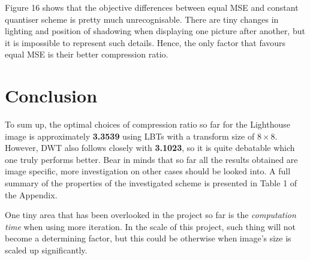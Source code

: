 \documentclass[a4paper, 11pt]{article}
\begin{document}
Figure 16 shows that the objective differences between equal MSE and constant quantiser scheme is pretty much unrecognisable. There are tiny changes in lighting and position of shadowing when displaying one picture after another, but it is impossible to represent such details. Hence, the only factor that favours equal MSE is their better compression ratio. 

\section{Conclusion}
To sum up, the optimal choices of compression ratio so far for the Lighthouse image is approximately \textbf{3.3539} using LBTs with a transform size of $8 \times 8$. However, DWT also follows closely with \textbf{3.1023}, so it is quite debatable which one truly performs better. Bear in minds that so far all the results obtained are image specific, more investigation on other cases should be looked into. A full summary of the properties of the investigated scheme is presented in Table 1 of the Appendix. 

One tiny area that has been overlooked in the project so far is the \textit{computation time} when using more iteration. In the scale of this project, such thing will not become a determining factor, but this could be otherwise when image's size is scaled up significantly.

\newpage
\end{document}
